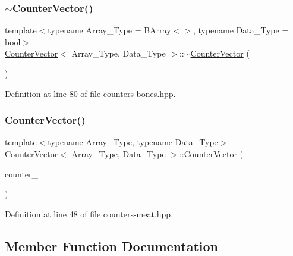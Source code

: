 \subsubsection{\texorpdfstring{$\sim$\+Counter\+Vector()}{~CounterVector()}}
{\footnotesize\ttfamily template$<$typename Array\+\_\+\+Type = B\+Array$<$$>$, typename Data\+\_\+\+Type = bool$>$ \\
\hyperlink{class_counter_vector}{Counter\+Vector}$<$ Array\+\_\+\+Type, Data\+\_\+\+Type $>$\+::$\sim$\hyperlink{class_counter_vector}{Counter\+Vector} (\begin{DoxyParamCaption}{ }\end{DoxyParamCaption})\hspace{0.3cm}{\ttfamily [inline]}}



Definition at line 80 of file counters-\/bones.\+hpp.

\mbox{\label{class_counter_vector_aaa2e5f597feaf8569ca098be1c9069e0}} 
\subsubsection{\texorpdfstring{Counter\+Vector()}{CounterVector()}\hspace{0.1cm}{\footnotesize\ttfamily [2/2]}}
{\footnotesize\ttfamily template$<$typename Array\+\_\+\+Type, typename Data\+\_\+\+Type$>$ \\
\hyperlink{class_counter_vector}{Counter\+Vector}$<$ Array\+\_\+\+Type, Data\+\_\+\+Type $>$\+::\hyperlink{class_counter_vector}{Counter\+Vector} (\begin{DoxyParamCaption}\item[{const \hyperlink{class_counter_vector}{Counter\+Vector}$<$ Array\+\_\+\+Type, Data\+\_\+\+Type $>$ \&}]{counter\+\_\+ }\end{DoxyParamCaption})\hspace{0.3cm}{\ttfamily [inline]}}



Definition at line 48 of file counters-\/meat.\+hpp.



\subsection{Member Function Documentation}
\mbox{\label{class_counter_vector_a34fda06ff678691daf3b0455c1a2af48}} 
